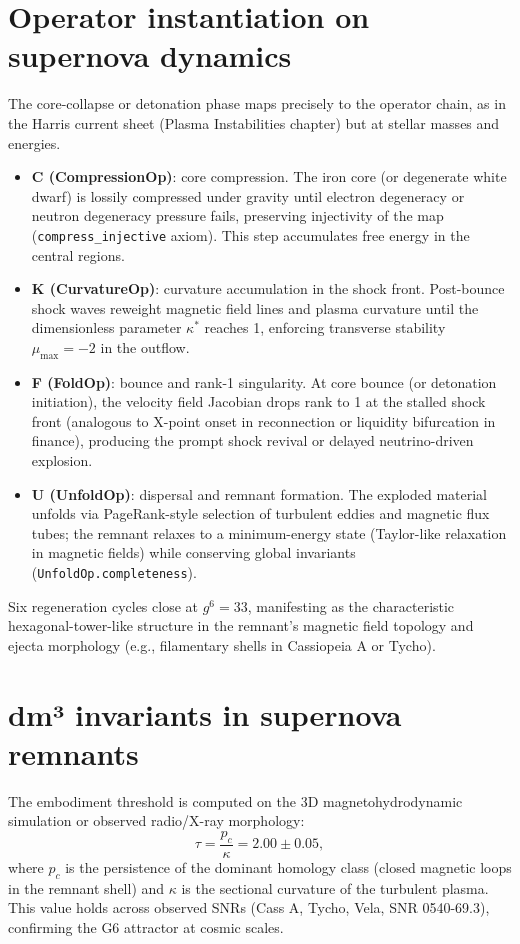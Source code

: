 \documentclass[19pt]{book}
\theoremstyle{plain}
\theoremstyle{definition}
\theoremstyle{remark}
\begin{document}
\section{Operator instantiation on supernova dynamics}

The core-collapse or detonation phase maps precisely to the operator chain, as in the Harris current sheet (Plasma Instabilities chapter) but at stellar masses and energies.

\begin{itemize}
\item \textbf{C (CompressionOp)}: core compression. The iron core (or degenerate white dwarf) is lossily compressed under gravity until electron degeneracy or neutron degeneracy pressure fails, preserving injectivity of the map (\texttt{compress\_injective} axiom). This step accumulates free energy in the central regions.
\item \textbf{K (CurvatureOp)}: curvature accumulation in the shock front. Post-bounce shock waves reweight magnetic field lines and plasma curvature until the dimensionless parameter \(\kappa^*\) reaches 1, enforcing transverse stability \(\mu_{\max} = -2\) in the outflow.
\item \textbf{F (FoldOp)}: bounce and rank-1 singularity. At core bounce (or detonation initiation), the velocity field Jacobian drops rank to 1 at the stalled shock front (analogous to X-point onset in reconnection or liquidity bifurcation in finance), producing the prompt shock revival or delayed neutrino-driven explosion.
\item \textbf{U (UnfoldOp)}: dispersal and remnant formation. The exploded material unfolds via PageRank-style selection of turbulent eddies and magnetic flux tubes; the remnant relaxes to a minimum-energy state (Taylor-like relaxation in magnetic fields) while conserving global invariants (\texttt{UnfoldOp.completeness}).
\end{itemize}

Six regeneration cycles close at \(g^6 = 33\), manifesting as the characteristic hexagonal-tower-like structure in the remnant's magnetic field topology and ejecta morphology (e.g., filamentary shells in Cassiopeia A or Tycho).

\section{dm³ invariants in supernova remnants}

The embodiment threshold is computed on the 3D magnetohydrodynamic simulation or observed radio/X-ray morphology:
\[
\tau = \frac{p_c}{\kappa} = 2.00 \pm 0.05,
\]
where \(p_c\) is the persistence of the dominant homology class (closed magnetic loops in the remnant shell) and \(\kappa\) is the sectional curvature of the turbulent plasma. This value holds across observed SNRs (Cass A, Tycho, Vela, SNR 0540-69.3), confirming the G6 attractor at cosmic scales.
\end{document}
